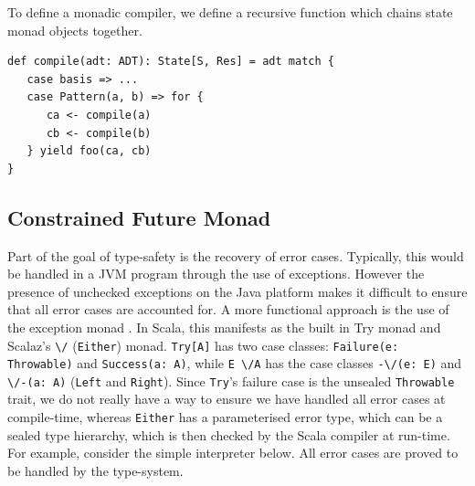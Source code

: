 \documentclass[12pt,a4paper,twoside,openright]{report}
\newcommand\codeName[1]{\texttt{#1}}
\newcommand\either[0]{\textbackslash/}
\newcommand\eitherR[0]{\textbackslash/-}
\newcommand\eitherL[0]{-\textbackslash/}
\renewcommand{\baselinestretch}{1.1}    %
\begin{document}
To define a monadic compiler, we define a recursive function which chains state monad objects together.

\renewcommand{\baselinestretch}{0.8}
\begin{framed}
\begin{verbatim}
def compile(adt: ADT): State[S, Res] = adt match {
   case basis => ...
   case Pattern(a, b) => for {
      ca <- compile(a)
      cb <- compile(b)
   } yield foo(ca, cb) 
}
\end{verbatim}
\end{framed}


	\subsection{Constrained Future Monad}
	Part of the goal of type-safety is the recovery of error cases. Typically, this would be handled in a JVM program through the use of exceptions. However the presence of unchecked exceptions on the Java platform makes it difficult to ensure that all error cases are accounted for. A more functional approach is the use of the exception monad \cite{ExceptionMonad}. In Scala, this manifests as the built in Try monad and Scalaz's \codeName{\either} (\codeName{Either}) monad. \codeName{Try[A]} has two case classes: \codeName{Failure(e: Throwable)} and \codeName{Success(a: A)}, while \codeName{E \either A} has the case classes \codeName{\eitherL(e: E)} and \codeName{\eitherR(a: A)} (\codeName{Left} and \codeName{Right}). Since \codeName{Try}'s failure case is the unsealed \codeName{Throwable} trait, we do not really have a way to ensure we have handled all error cases at compile-time, whereas \codeName{Either} has a parameterised error type, which can be a sealed type hierarchy, which is then checked by the Scala compiler at run-time. For example, consider the simple interpreter below. All error cases are proved to be handled by the type-system.
\end{document}
